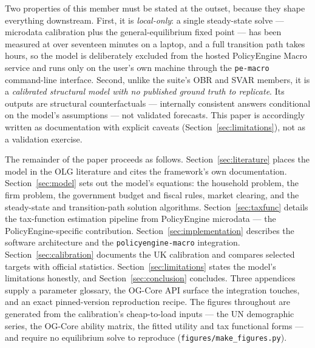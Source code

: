 Two properties of this member must be stated at the outset, because they shape everything downstream. First, it is \emph{local-only}: a single steady-state solve --- microdata calibration plus the general-equilibrium fixed point --- has been measured at over seventeen minutes on a laptop, and a full transition path takes hours, so the model is deliberately excluded from the hosted PolicyEngine Macro service and runs only on the user's own machine through the \texttt{pe-macro} command-line interface. Second, unlike the suite's OBR and SVAR members, it is a \emph{calibrated structural model with no published ground truth to replicate}. Its outputs are structural counterfactuals --- internally consistent answers conditional on the model's assumptions --- not validated forecasts. This paper is accordingly written as documentation with explicit caveats (Section~\ref{sec:limitations}), not as a validation exercise.

The remainder of the paper proceeds as follows. Section~\ref{sec:literature} places the model in the OLG literature and cites the framework's own documentation. Section~\ref{sec:model} sets out the model's equations: the household problem, the firm problem, the government budget and fiscal rules, market clearing, and the steady-state and transition-path solution algorithms. Section~\ref{sec:taxfunc} details the tax-function estimation pipeline from PolicyEngine microdata --- the PolicyEngine-specific contribution. Section~\ref{sec:implementation} describes the software architecture and the \texttt{policyengine-macro} integration. Section~\ref{sec:calibration} documents the UK calibration and compares selected targets with official statistics. Section~\ref{sec:limitations} states the model's limitations honestly, and Section~\ref{sec:conclusion} concludes. Three appendices supply a parameter glossary, the OG-Core API surface the integration touches, and an exact pinned-version reproduction recipe. The figures throughout are generated from the calibration's cheap-to-load inputs --- the UN demographic series, the OG-Core ability matrix, the fitted utility and tax functional forms --- and require no equilibrium solve to reproduce (\texttt{figures/make\_figures.py}).
